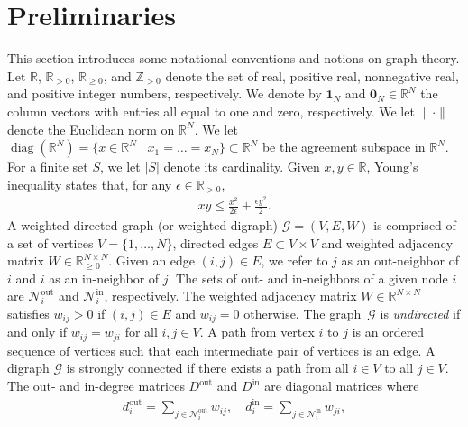 \documentclass[]{book}
\newcommand{\real}{{\mathbb{R}}}
\newcommand{\realpositive}{\mathbb{R}_{>0}}
\newcommand{\realnonnegative}{\mathbb{R}_{\ge 0}}
\newcommand{\integerpositive}{\mathbb{Z}_{> 0}}
\newcommand{\GG}{{\mathcal{G}}}
\newcommand{\douti}{d_i^{\operatorname{out}}}
\newcommand{\Nouti}{\mathcal{N}_i^{\operatorname{out}}}
\newcommand{\Nini}{\mathcal{N}_i^{\operatorname{in}}}
\newcommand{\Dout}{D^{\operatorname{out}}}
\newcommand{\Din}{D^{\operatorname{in}}}
\newcommand{\ones}[1]{\mathbf{1}_{#1}}
\newcommand{\zeros}[1]{\mathbf{0}_{#1}}
\newcommand{\diag}[1]{\operatorname{diag} ( #1)}
\newcommand{\vertices}{V}
\newcommand{\Norm}[1]{\|#1\|}
\newcommand{\until}[1]{\{1,\dots, #1\}}
\newcommand{\setdef}[2]{\{#1 \; | \; #2\}}
\newcommand{\commgraph}{\GG_\text{comm}}
\renewcommand{\commgraph}{\GG}
\begin{document}
\section{Preliminaries}

This section introduces some notational conventions and notions on
graph theory.  Let $\real$, $\realpositive$, $\realnonnegative$, and
$\integerpositive$ denote the set of real, positive real, nonnegative
real, and positive integer numbers, respectively. We denote by
$\ones{N}$ and $\zeros{N} \in \real^N$ the column vectors with entries
all equal to one and zero, respectively. We let $\Norm{\cdot}$ denote
the Euclidean norm on $\real^N$. We let $\diag{\real^N} = \setdef{x
  \in \real^N}{x_1=\dots=x_N} \subset \real^N$ be the agreement
subspace in $\real^N$.  For a finite set $S$, we let $|S|$ denote its
cardinality.
Given $x, y \in \real$, Young's inequality
states that, for any $\epsilon \in \realpositive$,
\begin{align}\label{eq:Young}
  xy \leq \frac{x^2}{2\epsilon} + \frac{ \epsilon y^2}{2}.
\end{align}
A weighted directed graph (or weighted digraph) $\commgraph = (V,E,W)$
is comprised of a set of vertices $V = \until{N}$, directed edges $E
\subset V \times V$ and weighted adjacency matrix $W \in
\realnonnegative^{N \times N}$. Given an edge $(i,j) \in E$, we refer
to $j$ as an out-neighbor of $i$ and $i$ as an in-neighbor of $j$.
The sets of out- and in-neighbors of a given node $i$ are $\Nouti$ and
$\Nini$, respectively. The weighted adjacency matrix $W \in \real^{N
  \times N}$ satisfies $w_{ij} > 0$ if $(i, j) \in E$ and $w_{ij} = 0$
otherwise. The graph~$\commgraph$ is \emph{undirected} if and only
if $w_{ij} = w_{ji}$ for all $i,j \in \vertices$.
A path from vertex $i$ to $j$ is an ordered sequence of
vertices such that each intermediate pair of vertices is an edge.  A
digraph $\commgraph$ is strongly connected if there exists a path from
all $i \in V$ to all $j \in V$.  The out- and in-degree matrices
$\Dout$ and $\Din$ are diagonal matrices where
\begin{align*}
  \douti = \sum_{j \in \Nouti} w_{ij} , \quad d_i^{\operatorname{in}} =
  \sum_{j \in \Nini} w_{ji} ,
\end{align*}
\end{document}
